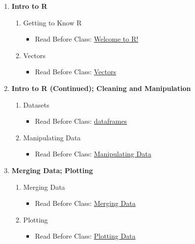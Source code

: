 \documentclass[12pt]{article}
\begin{document}
\begin{enumerate}[label=\textbf{Week \arabic*:}]
	\item \textbf{Intro to R}
	\begin{enumerate}[label=Class \arabic*:]
		\item Getting to Know R
		\begin{itemize}
			\item Read Before Class: \href{https://nickeubank.github.io/rfordatascience/html/introduction.html}{Welcome to R!}
		\end{itemize}
		\item Vectors
		\begin{itemize}
			\item Read Before Class: \href{https://nickeubank.github.io/rfordatascience/html/vectors.html}{Vectors}
		\end{itemize}
	\end{enumerate}

	\item \textbf{Intro to R (Continued); Cleaning and Manipulation}
	\begin{enumerate}[label=Class \arabic*:]
		\item Datasets
		\begin{itemize}
			\item Read Before Class: \href{https://nickeubank.github.io/rfordatascience/html/dataframes.html}{dataframes}
		\end{itemize}
		\item Manipulating Data
		\begin{itemize}
			\item Read Before Class: \href{https://nickeubank.github.io/rfordatascience/html/modifying-data.html}{Manipulating Data}
		\end{itemize}
	\end{enumerate}

	\item \textbf{Merging Data; Plotting}
	\begin{enumerate}[label=Class \arabic*:]
		\item Merging Data
		\begin{itemize}
			\item Read Before Class: \href{https://nickeubank.github.io/rfordatascience/html/merging-appending.html}{Merging Data}
		\end{itemize}
		\item Plotting
		\begin{itemize}
			\item Read Before Class: \href{https://nickeubank.github.io/rfordatascience/html/plotting.html}{Plotting Data}
		\end{itemize}
	\end{enumerate}


\end{enumerate}
\end{document}
